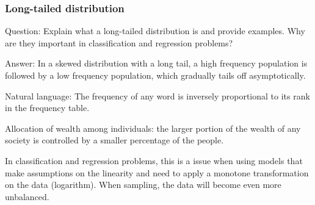 \documentclass[11pt]{beamer}
\begin{document}
\begin{frame}
\frametitle{Long-tailed distribution}
\begin{block}{Question:}
	Explain what a long-tailed distribution is and provide examples. Why are they important in classification and regression problems?
\end{block}
\begin{block}{Answer:}
	In a skewed distribution with a long tail, a high frequency population is followed by a low frequency population, which gradually tails off asymptotically.
	
	Natural language:
	The frequency of any word is inversely proportional to its rank in the frequency table. 
	
	Allocation of wealth among individuals: the larger portion of the wealth of any society is controlled by a smaller percentage of the people. 
	
	In classification and regression problems, this is a issue when using models that make assumptions on the linearity and need to apply a monotone transformation on the data (logarithm). When sampling, the data will become even more unbalanced.
\end{block}
\end{frame}
\end{document}
